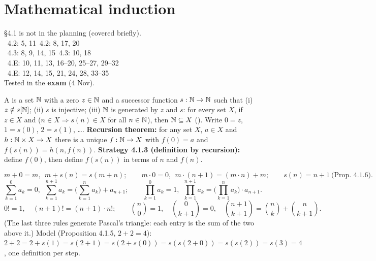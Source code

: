 \chapter{Mathematical induction}
%
{\S4.1 is not in the planning (covered briefly).\\ \fE\ 4.2: 5, 11\quad \fR\ 4.2: 8, 17, 20\\ \fE\ 4.3: 8, 9, 14, 15\quad \fR\ 4.3: 10, 18\\ \fE\ 4.E: 10, 11, 13, 16--20, 25--27, 29--32\\ \fR\ 4.E: 12, 14, 15, 21, 24, 28, 33--35\\ Tested in the \textbf{exam} (4 Nov).}


\begin{key}
A  is a set $\mathbb{N}$ with a zero $z\in\mathbb{N}$ and a successor function $s:\mathbb{N}\to\mathbb{N}$ such that (i) $z\notin s[\mathbb{N}]$; (ii) $s$ is injective; (iii) $\mathbb{N}$ is generated by $z$ and $s$: for every set $X$, if $z\in X$ and ($n\in X\Rightarrow s(n)\in X$ for all $n\in\mathbb{N}$), then $\mathbb{N}\subseteq X$ (). Write $0=z$, $1=s(0)$, $2=s(1)$, \dots. \textbf{Recursion theorem:} for any set $X$, $a\in X$ and $h:\mathbb{N}\times X\to X$ there is a unique $f:\mathbb{N}\to X$ with $f(0)=a$ and $f(s(n))=h(n,f(n))$. \textbf{Strategy 4.1.3 (definition by recursion):} define $f(0)$, then define $f(s(n))$ in terms of $n$ and $f(n)$.
\end{key}
\begin{key}
\[
m+0=m,\ \ m+s(n)=s(m+n);\qquad m\cdot0=0,\ \ m\cdot(n+1)=(m\cdot n)+m;\qquad s(n)=n+1\ \text{(Prop.\ 4.1.6)}.
\]
\[
\sum_{k=1}^{0}a_k=0,\ \ \sum_{k=1}^{n+1}a_k=\Big(\sum_{k=1}^na_k\Big)+a_{n+1};\qquad \prod_{k=1}^{0}a_k=1,\ \ \prod_{k=1}^{n+1}a_k=\Big(\prod_{k=1}^na_k\Big)\cdot a_{n+1}.
\]
\[
0!=1,\quad (n+1)!=(n+1)\cdot n!;\qquad \binom n0=1,\quad \binom0{k+1}=0,\quad \binom{n+1}{k+1}=\binom nk+\binom n{k+1}.
\]
(The last three rules generate Pascal's triangle: each entry is the sum of the two above it.)
Model (Proposition 4.1.5, $2+2=4$): $2+2=2+s(1)=s(2+1)=s(2+s(0))=s(s(2+0))=s(s(2))=s(3)=4$, one definition per step.
\end{key}

